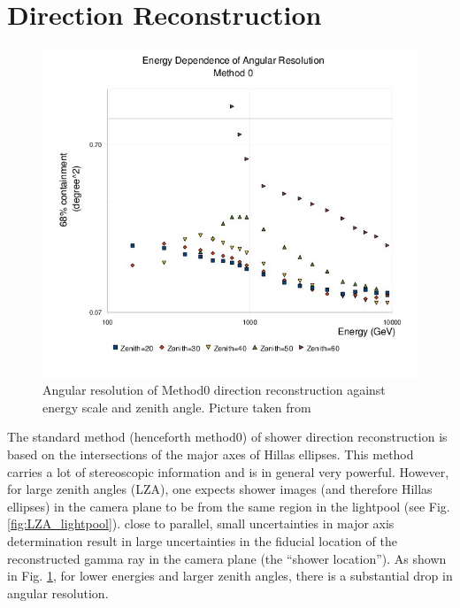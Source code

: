 \documentclass[main.tex]{subfiles}
\begin{document}
\section{Direction Reconstruction}
\begin{figure}[htbp]
  \centering
  \includegraphics[width=.6\linewidth]{images/Method0_res}
  \caption[Angular resolution of Method0]{Angular resolution of Method0 direction reconstruction against energy scale and zenith angle. Picture taken from \cite{veritas_web}}
  \label{fig:disp_res}
\end{figure}
The standard method (henceforth method0) of shower direction reconstruction is based on the intersections of the major axes of Hillas ellipses. This method carries a lot of stereoscopic information and is in general very powerful. However, for large zenith angles (LZA), one expects shower images (and therefore Hillas ellipses) in the camera plane to be from the same region in the lightpool (see Fig. \ref{fig:LZA_lightpool}). close to parallel, small uncertainties in major axis determination result in large uncertainties in the fiducial location of the reconstructed gamma ray in the camera plane (the ``shower location''). As shown in Fig. \ref{fig:disp_res}, for lower energies and larger zenith angles, there is a substantial drop in angular resolution.
\end{document}
